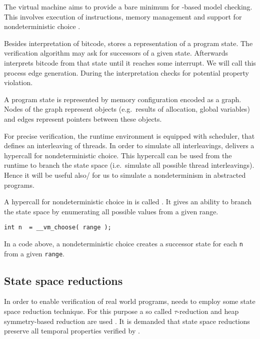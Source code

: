 The \DIVINE virtual machine aims to provide a bare minimum for \LLVM-based model
checking. This involves execution of instructions, memory management and support
for nondeterministic choice \cite{RockaiCB17}.

Besides interpretation of \LLVM bitcode, \DIVM stores a representation of a
program state. The verification algorithm may ask \DIVM for successors of a
given state. Afterwards \DIVM interprets \LLVM bitcode from that state until it
reaches some interrupt. We will call this process edge generation.  During
the interpretation \DIVM checks for potential property violation.

A program state is represented by memory configuration encoded as a graph.
Nodes of the graph represent objects (e.g.~results of allocation, global
variables) and edges represent pointers between these objects.

For precise verification, the runtime environment is equipped with scheduler,
that defines an interleaving of threads. In order to simulate all interleavings,
\DIVM delivers a hypercall for nondeterministic choice. This hypercall can be
used from the runtime to branch the state space (i.e.~simulate all possible
thread interleavings). Hence it will be useful also/
for us to simulate a nondeterminism in abstracted programs.

\begin{example}
A hypercall for nondeterministic choice in \DIVM is called .
It gives an ability to branch the state space by enumerating all possible values
from a given range.

\begin{verbatim}
int n  = __vm_choose( range );
\end{verbatim}
\noindent
In a code above, a nondeterministic choice creates a successor state for each
\texttt{n} from a given \texttt{range}.

\end{example}
\subsection{State space reductions}

In order to enable verification of real world programs, \DIVINE needs to employ
some state space reduction technique. For this purpose a so called
$\tau$-reduction and heap symmetry-based reduction are used \cite{Rockai13,
RockaiCB17}.  It is
demanded that state space reductions preserve all temporal properties
verified by \DIVINE.

